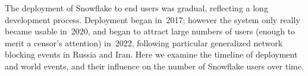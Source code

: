 \documentclass[letterpaper,twocolumn]{article}
\begin{document}

The deployment of Snowflake to end users was gradual,
reflecting a long development process.
Deployment began in~2017;
however the system only really became usable in~2020,
and began to attract large numbers of users
(enough to merit a censor's attention)
in~2022, following particular generalized
network blocking events in Russia and Iran.
Here we examine the timeline of deployment
and world events,
and their influence on the number of Snowflake users over time.
\end{document}
